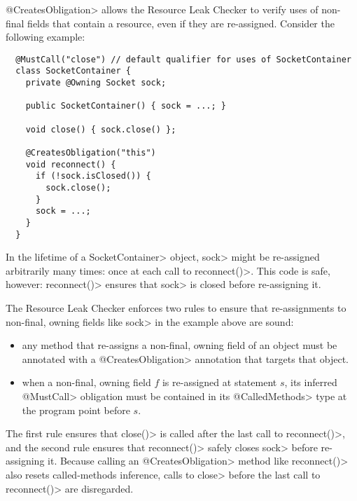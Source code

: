 
\<@CreatesObligation> allows the Resource Leak Checker to verify uses of non-final fields
that contain a resource, even if they are re-assigned. Consider
the following example:

\begin{verbatim}
  @MustCall("close") // default qualifier for uses of SocketContainer
  class SocketContainer {
    private @Owning Socket sock;

    public SocketContainer() { sock = ...; }

    void close() { sock.close() };

    @CreatesObligation("this")
    void reconnect() {
      if (!sock.isClosed()) {
        sock.close();
      }
      sock = ...;
    }
  }
\end{verbatim}

In the lifetime of a \<SocketContainer> object, \<sock>
might be re-assigned arbitrarily many times: once at each
call to \<reconnect()>. This code is safe, however: \<reconnect()>
ensures that \<sock> is closed before re-assigning it.

The Resource Leak Checker enforces two rules to ensure that
re-assignments to non-final, owning fields like \<sock> in the example
above are sound:
\begin{itemize}
\item any method that re-assigns a non-final, owning field of an object
  must be annotated with a \<@CreatesObligation> annotation
  that targets that object.
\item when a non-final, owning field $f$ is re-assigned at statement $s$,
  its inferred \<@MustCall> obligation must be contained in its \<@CalledMethods>
  type at the program point before $s$.
\end{itemize}
\noindent
The first rule ensures that \<close()> is called after the last call
to \<reconnect()>, and the second rule ensures that \<reconnect()>
safely closes \<sock> before re-assigning it. Because calling
an \<@CreatesObligation> method like \<reconnect()> also resets called-methods
inference, calls to \<close> before the last call to \<reconnect()>
are disregarded.


